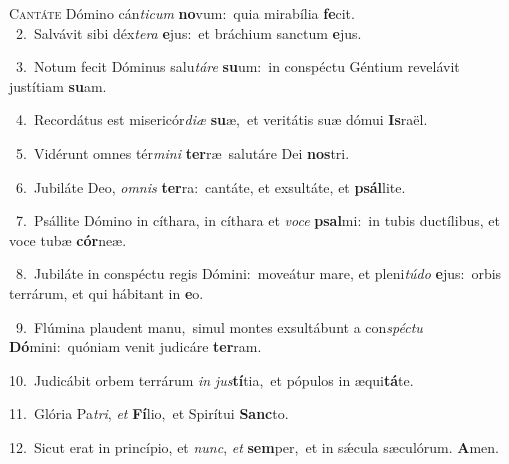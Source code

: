 \lettrine{\initial\textcolor{\initialcolor}{C}}{antáte} Dómino cán\-\textit{ti}\-\textit{cum} \textbf{no}\-vum:~\star quia mirabília \textbf{fe}\-cit.\\
{\numbfont\textcolor{\numbcolor}{~2.}}~Salvávit sibi déx\-\textit{te}\-\textit{ra} \textbf{e}\-jus:~\star et bráchium sanctum \textbf{e}\-jus.\par
{\numbfont\textcolor{\numbcolor}{~3.}}~Notum fecit Dóminus salu\-\textit{tá}\-\textit{re} \textbf{su}\-um:~\star in conspéctu Géntium revelávit justítiam \textbf{su}\-am.\par
{\numbfont\textcolor{\numbcolor}{~4.}}~Recordátus est misericór\-\textit{di}\-\textit{æ} \textbf{su}\-æ,~\star et veritátis suæ dómui \textbf{Is}\-raël.\par
{\numbfont\textcolor{\numbcolor}{~5.}}~Vidérunt omnes tér\-\textit{mi}\-\textit{ni} \textbf{ter}\-ræ~\star salutáre Dei \textbf{nos}\-tri.\par
{\numbfont\textcolor{\numbcolor}{~6.}}~Jubiláte Deo, \textit{om}\-\textit{nis} \textbf{ter}\-ra:~\star cantáte, et exsultáte, et \textbf{psál}\-lite.\par
{\numbfont\textcolor{\numbcolor}{~7.}}~Psállite Dómino in cíthara, in cíthara et \textit{vo}\-\textit{ce} \textbf{psal}\-mi:~\star in tubis ductílibus, et voce tubæ \textbf{cór}\-neæ.\par
{\numbfont\textcolor{\numbcolor}{~8.}}~Jubiláte in conspéctu regis Dómini:~\dagger moveátur mare, et pleni\-\textit{tú}\-\textit{do} \textbf{e}\-jus:~\star orbis terrárum, et qui hábitant in \textbf{e}\-o.\par
{\numbfont\textcolor{\numbcolor}{~9.}}~Flúmina plaudent manu,~\dagger simul montes exsultábunt a con\-\textit{spéc}\-\textit{tu} \textbf{Dó}\-mini:~\star quóniam venit judicáre \textbf{ter}\-ram.\par
{\numbfont\textcolor{\numbcolor}{10.}}~Judicábit orbem terrárum \textit{in} \textit{jus}\-\textbf{tí}tia,~\star et pópulos in æqui\-\textbf{tá}\-te.\par
{\numbfont\textcolor{\numbcolor}{11.}}~Glória Pa\-\textit{tri}\-, \textit{et} \textbf{Fí}\-lio,~\star et Spirítui \textbf{Sanc}\-to.\par
{\numbfont\textcolor{\numbcolor}{12.}}~Sicut erat in princípio, et \textit{nunc}\-, \textit{et} \textbf{sem}\-per,~\star et in sǽcula sæculórum. \textbf{A}\-men.\par
